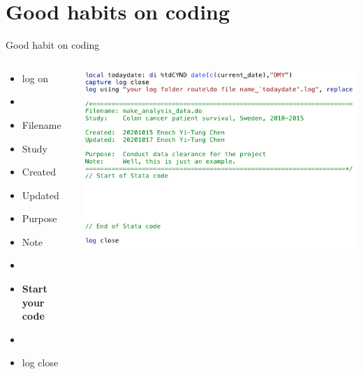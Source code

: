 \documentclass{beamer}
\begin{document}
\section{Good habits on coding}
\begin{frame}[allowframebreaks]{Good habit on coding}
\begin{columns}
	\begin{column}{0.3\textwidth} 
	\begin{itemize}
	\item log on
	\item[] 
	\item Filename
	\item Study
	\item Created
	\item Updated
	\item Purpose
	\item Note
	\item[] 
	\item \textbf{Start your code}
	\item[] 
	\item log close
	\end{itemize}
	\end{column}
	
	\begin{column}{0.7\textwidth} 
			\includegraphics[scale=0.5]{image/header}
	\end{column}

\end{columns}

\newpage


\end{frame}
\end{document}
